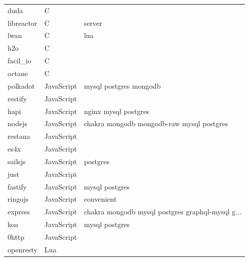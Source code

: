 \begin{longtable}{lll}
    duda             & C           &                                                    \\
    libreactor       & C           & server                                             \\
    lwan             & C           & lua                                                \\
    h2o              & C           &                                                    \\
    facil\_io        & C           &                                                    \\
    octane           & C           &                                                    \\
    polkadot         & JavaScript  & mysql postgres mongodb                             \\
    restify          & JavaScript  &                                                    \\
    hapi             & JavaScript  & nginx mysql postgres                               \\
    nodejs           & JavaScript  & chakra mongodb mongodb-raw mysql postgres          \\
    restana          & JavaScript  &                                                    \\
    es4x             & JavaScript  &                                                    \\
    sailsjs          & JavaScript  & postgres                                           \\
    just             & JavaScript  &                                                    \\
    fastify          & JavaScript  & mysql postgres                                     \\
    ringojs          & JavaScript  & convenient                                         \\
    express          & JavaScript  & chakra mongodb mysql postgres graphql-mysql g...   \\
    koa              & JavaScript  & mysql postgres                                     \\
    0http            & JavaScript  &                                                    \\
    openresty        & Lua         &                                                    \\

\end{longtable}

